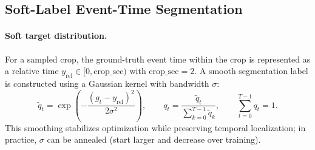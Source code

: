 \documentclass[12pt]{article}
\begin{document}
\subsection{Soft-Label Event-Time Segmentation}

\paragraph{Soft target distribution.}
For a sampled crop, the ground-truth event time within the crop is represented as a relative time
$y_{\mathrm{rel}}\in[0,\mathrm{crop\_sec})$ with $\mathrm{crop\_sec}=2$.
A smooth segmentation label is constructed using a Gaussian kernel with bandwidth $\sigma$:
\begin{equation}
\label{eq:rt_soft_target}
\tilde q_t=\exp\left(-\frac{(g_t-y_{\mathrm{rel}})^2}{2\sigma^2}\right),\qquad
q_t=\frac{\tilde q_t}{\sum_{k=0}^{T-1}\tilde q_k},\qquad
\sum_{t=0}^{T-1} q_t=1.
\end{equation}
This smoothing stabilizes optimization while preserving temporal localization; in practice, $\sigma$ can be annealed
(start larger and decrease over training).
\end{document}
